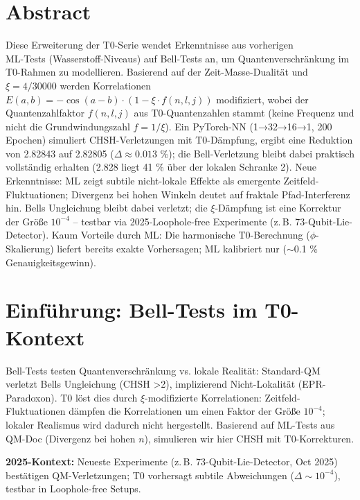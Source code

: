 
	
	\section*{Abstract}
	Diese Erweiterung der T0-Serie wendet Erkenntnisse aus vorherigen \\ML-Tests (Wasserstoff-Niveaus) auf Bell-Tests an, um Quantenverschränkung im T0-Rahmen zu modellieren. Basierend auf der Zeit-Masse-Dualität und $\xi = 4/30000$ werden Korrelationen $E(a,b) = -\cos(a-b) \cdot (1 - \xi \cdot f(n,l,j))$ modifiziert, wobei der Quantenzahlfaktor $f(n,l,j)$ aus T0-Quantenzahlen stammt (keine Frequenz und nicht die Grundwindungszahl $f = 1/\xi$). Ein PyTorch-NN (1→32→16→1, 200 Epochen) simuliert CHSH-Verletzungen mit T0-Dämpfung, ergibt eine Reduktion von 2.82843 auf 2.82805 ($\Delta \approx 0.013$ \%); die Bell-Verletzung bleibt dabei praktisch vollständig erhalten (2.828 liegt 41 \% über der lokalen Schranke 2). Neue Erkenntnisse: ML zeigt subtile nicht-lokale Effekte als emergente Zeitfeld-Fluktuationen; Divergenz bei hohen Winkeln deutet auf fraktale Pfad-Interferenz hin. Bells Ungleichung bleibt dabei verletzt; die $\xi$-Dämpfung ist eine Korrektur der Größe $10^{-4}$ – testbar via 2025-Loophole-free Experimente (z.\,B. 73-Qubit-Lie-Detector). Kaum Vorteile durch ML: Die harmonische T0-Berechnung ($\phi$-Skalierung) liefert bereits exakte Vorhersagen; ML kalibriert nur ($\sim$0.1 \% Genauigkeitsgewinn).


	\section{Einführung: Bell-Tests im T0-Kontext}
	\label{sec:intro_bell}
	
	Bell-Tests testen Quantenverschränkung vs. lokale Realität: Standard-QM verletzt Bells Ungleichung (CHSH >2), implizierend Nicht-Lokalität (EPR-Paradoxon). T0 löst dies durch $\xi$-modifizierte Korrelationen: Zeitfeld-Fluktuationen dämpfen die Korrelationen um einen Faktor der Größe $10^{-4}$; lokaler Realismus wird dadurch nicht hergestellt. Basierend auf ML-Tests aus QM-Doc (Divergenz bei hohen $n$), simulieren wir hier CHSH mit T0-Korrekturen.
	
	\textbf{2025-Kontext:} Neueste Experimente (z.\,B. 73-Qubit-Lie-Detector, Oct 2025)\cite{sciencedaily2025} bestätigen QM-Verletzungen; T0 vorhersagt subtile Abweichungen ($\Delta \sim 10^{-4}$), testbar in Loophole-free Setups.
	
